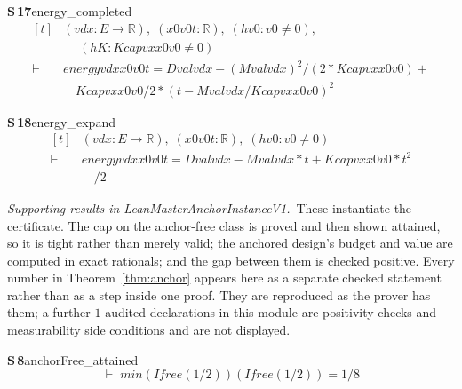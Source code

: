 \documentclass[conference]{IEEEtran}
\theoremstyle{definition}
\newcommand{\lean}[1]{\textsf{\footnotesize #1}}
\begin{document}
\noindent\textbf{S\,17}\quad\lean{energy\_completed}
{\footnotesize\[ \begin{aligned}[t]
&(\mathit{v} \mathit{d} \mathit{x} : \mathit{E} \to \mathbb{R} ),\; (\mathit{x0} \mathit{v0} \mathit{t} : \mathbb{R} ),\; (\mathit{hv0} : \mathit{v0} \neq 0),\\
&\quad \; (\mathit{hK} : \mathit{Kcap} \mathit{v} \mathit{x} \mathit{x0} \mathit{v0} \neq 0)\\
\vdash\;&\mathit{energy} \mathit{v} \mathit{d} \mathit{x} \mathit{x0} \mathit{v0} \mathit{t} = \mathit{Dval} \mathit{v} \mathit{d} \mathit{x} - (\mathit{Mval} \mathit{v} \mathit{d} \mathit{x}) ^{2} / (2 * \mathit{Kcap} \mathit{v} \mathit{x} \mathit{x0} \mathit{v0}) +\\
&\quad \mathit{Kcap} \mathit{v} \mathit{x} \mathit{x0} \mathit{v0} / 2 * (\mathit{t} - \mathit{Mval} \mathit{v} \mathit{d} \mathit{x} / \mathit{Kcap} \mathit{v} \mathit{x} \mathit{x0} \mathit{v0}) ^{2}
\end{aligned} \]}

\noindent\textbf{S\,18}\quad\lean{energy\_expand}
{\footnotesize\[ \begin{aligned}[t]
&(\mathit{v} \mathit{d} \mathit{x} : \mathit{E} \to \mathbb{R} ),\; (\mathit{x0} \mathit{v0} \mathit{t} : \mathbb{R} ),\; (\mathit{hv0} : \mathit{v0} \neq 0)\\
\vdash\;&\mathit{energy} \mathit{v} \mathit{d} \mathit{x} \mathit{x0} \mathit{v0} \mathit{t} = \mathit{Dval} \mathit{v} \mathit{d} \mathit{x} - \mathit{Mval} \mathit{v} \mathit{d} \mathit{x} * \mathit{t} + \mathit{Kcap} \mathit{v} \mathit{x} \mathit{x0} \mathit{v0} * \mathit{t} ^{2}\\
&\quad / 2
\end{aligned} \]}


\noindent\emph{Supporting results in \lean{LeanMasterAnchorInstanceV1}.}~These instantiate the certificate. The cap on the anchor-free class is proved and then shown attained, so it is tight rather than merely valid; the anchored design's budget and value are computed in exact rationals; and the gap between them is checked positive. Every number in Theorem~\ref{thm:anchor} appears here as a separate checked statement rather than as a step inside one proof. They are reproduced as the prover has them; a further $1$ audited declarations in this module are positivity checks and measurability side conditions and are not displayed.

\noindent\textbf{S\,8}\quad\lean{anchorFree\_attained}
{\footnotesize\[ \vdash\; \mathit{min} (\mathit{Ifree} (1/2)) (\mathit{Ifree} (1/2)) = 1 / 8 \]}
\end{document}
